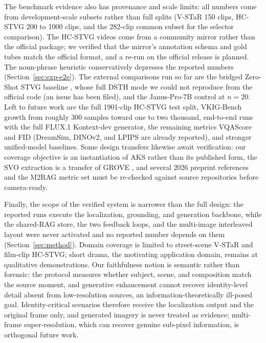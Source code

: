 \documentclass[10pt]{article}
\begin{document}
The benchmark evidence also has provenance and scale limits: all numbers come from development-scale subsets rather than full splits (V-STaR 150 clips, HC-STVG 200 to 1000 clips, and the 282-clip common subset for the selector comparison). The HC-STVG videos come from a community mirror rather than the official package; we verified that the mirror's annotation schema and gold tubes match the official format, and a re-run on the official release is planned. The noun-phrase heuristic conservatively depresses the reported numbers (Section~\ref{sec:exp-e2e}). The external comparisons run so far are the bridged Zero-Shot STVG baseline \citep{zeroshotstvg2509}, whose full DSTH mode we could not reproduce from the official code (an issue has been filed), and the Janus-Pro-7B control \citep{januspro2501} at $n=20$. Left to future work are the full 1901-clip HC-STVG test split, VKIG-Bench growth from roughly 300 samples toward one to two thousand, end-to-end runs with the full FLUX.1 Kontext-dev generator, the remaining metrics VQAScore and FID (DreamSim, DINOv2, and LPIPS are already reported), and stronger unified-model baselines. Some design transfers likewise await verification: our coverage objective is an instantiation of AKS \citep{aks2502} rather than its published form, the SVO extraction is a transfer of GROVE \citep{grove2503}, and several 2026 preprint references and the M2RAG \citep{m2rag2411} metric set must be re-checked against source repositories before camera-ready.

Finally, the scope of the verified system is narrower than the full design: the reported runs execute the localization, grounding, and generation backbone, while the shared-RAG store, the two feedback loops, and the multi-image interleaved layout were never activated and no reported number depends on them (Section~\ref{sec:method}). Domain coverage is limited to street-scene V-STaR \citep{vstar2503} and film-clip HC-STVG; short drama, the motivating application domain, remains at qualitative demonstrations. Our faithfulness notion is semantic rather than forensic: the protocol measures whether subject, scene, and composition match the source moment, and generative enhancement cannot recover identity-level detail absent from low-resolution sources, an information-theoretically ill-posed goal. Identity-critical scenarios therefore receive the localization output and the original frame only, and generated imagery is never treated as evidence; multi-frame super-resolution, which can recover genuine sub-pixel information, is orthogonal future work.
\end{document}
